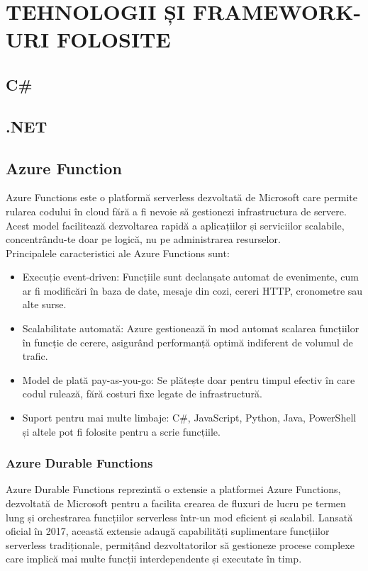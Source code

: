 \chapter{TEHNOLOGII ȘI FRAMEWORK-URI FOLOSITE}
\section{C\#}

\section{.NET}
\section{Azure Function}
Azure Functions este o platformă serverless dezvoltată de Microsoft care permite rularea codului în cloud fără a fi nevoie să gestionezi infrastructura de servere. Acest model facilitează dezvoltarea rapidă a aplicațiilor și serviciilor scalabile, concentrându-te doar pe logică, nu pe administrarea resurselor. \parencite{azureFunctions}
\\Principalele caracteristici ale Azure Functions sunt:
\begin{itemize}
    \item Execuție event-driven: Funcțiile sunt declanșate automat de evenimente, cum ar fi modificări în baza de date, mesaje din cozi, cereri HTTP, cronometre sau alte surse.
    \item Scalabilitate automată: Azure gestionează în mod automat scalarea funcțiilor în funcție de cerere, asigurând performanță optimă indiferent de volumul de trafic.
    \item Model de plată pay-as-you-go: Se plătește doar pentru timpul efectiv în care codul rulează, fără costuri fixe legate de infrastructură.
    \item Suport pentru mai multe limbaje: C\#, JavaScript, Python, Java, PowerShell și altele pot fi folosite pentru a scrie funcțiile.
\end{itemize}\parencite{azureFunctions}

\subsection{Azure Durable Functions}
Azure Durable Functions reprezintă o extensie a platformei Azure Functions, dezvoltată de Microsoft pentru a facilita crearea de fluxuri de lucru pe termen lung și orchestrarea funcțiilor serverless într-un mod eficient și scalabil. Lansată oficial în 2017, această extensie adaugă capabilități suplimentare funcțiilor serverless tradiționale, permițând dezvoltatorilor să gestioneze procese complexe care implică mai multe funcții interdependente și executate în timp. \parencite{azureDurableFunctions}

